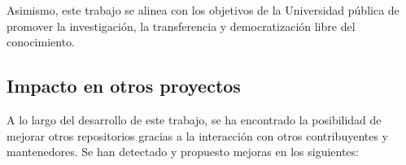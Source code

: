 Asimismo, este trabajo se alinea con los objetivos de la Universidad pública de promover la investigación, la transferencia y democratización libre del conocimiento.


\subsection{Impacto en otros proyectos} \label{sssct:impacto:otrosproyectos}

A lo largo del desarrollo de este trabajo, se ha encontrado la posibilidad de mejorar otros repositorios gracias a la interacción con otros contribuyentes y mantenedores. Se han detectado y propuesto mejoras en los siguientes:

